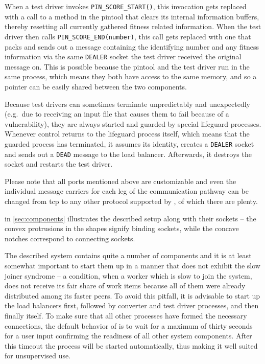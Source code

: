 When a test driver invokes \texttt{PIN\_SCORE\_START()}, this invocation gets replaced with a call to a method
in the pintool that clears its internal information buffers, thereby resetting all currently gathered fitness
related information. When the test driver then calls \texttt{PIN\_SCORE\_END(number)}, this call gets replaced
with one that packs and sends out a message containing the identifying number and any fitness information via
the same \zmq \texttt{DEALER} socket the test driver received the original message on. This is possible
because the pintool and the test driver run in the same process, which means they both have access to the same
memory, and so a pointer can be easily shared between the two components.

Because test drivers can sometimes terminate unpredictably and unexpectedly (e.g.\ due to receiving an input
file that causes them to fail because of a vulnerability), they are always started and guarded by special
lifeguard processes. Whenever control returns to the lifeguard process itself, which means that the guarded
process has terminated, it assumes its identity, creates a \texttt{DEALER} socket and sends out a \texttt{DEAD}
message to the load balancer. Afterwards, it destroys the socket and restarts the test driver.

Please note that all ports mentioned above are customizable and even the individual message carriers for
each leg of the communication pathway can be changed from tcp to any other protocol supported by \zmq, of which
there are plenty.

 in \cref{sec:components} illustrates the described setup along with their 
\zmq sockets -- the convex protrusions in the shapes signify binding sockets, while the concave notches
correspond to connecting sockets.

The described system contains quite a number of components and it is at least somewhat important to start them
up in a manner that does not exhibit the slow joiner syndrome -- a condition, when a worker which is slow to
join the system, does not receive its fair share of work items because all of them were already distributed
among its faster peers. To avoid this pitfall, it is advisable to start up the load balancers first, followed
by converter and test driver processes, and then finally \xmlmate itself. To make sure that all other
processes have formed the necessary connections, the default behavior of \xmlmate is to wait for a maximum of
thirty seconds for a user input confirming the readiness of all other system components. After this timeout the
process will be started automatically, thus making it well suited for unsupervised use.

